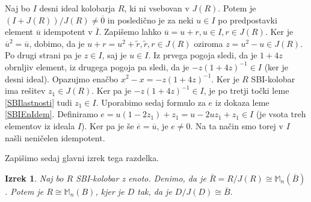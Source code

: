 \documentclass[a4paper, 12pt]{amsart}
\theoremstyle{definition} %
\theoremstyle{plain} %
\newtheorem{izrek}[definicija]{Izrek}
\newcommand{\M}{\mathbb M}
\begin{document}
\proof
Naj bo $I$ desni ideal kolobarja $R$, ki ni vsebovan v $J(R)$. Potem je $(I+J(R))/J(R) \neq \overline{0}$ in posledično je za neki $u\in I$ po predpostavki element $\overline{u}$ idempotent v $\overline{I}$. Zapišemo lahko $\overline{u} = u + r, u\in I, r \in J(R)$. Ker je $\overline{u}^2 = \overline{u}$, dobimo, da je $u+r = u^2 + \tilde{r}, \tilde{r},r\in J(R)$ oziroma $z= u^2 - u\in J(R)$. Po drugi strani pa je $z\in I$, saj je $u\in I$. Iz prvega pogoja sledi, da je $1+4z$ obrnljiv element, iz drugega pogoja pa sledi, da je $-z(1+4z)^{-1}\in I $ (ker je desni ideal). Opazujmo enačbo $x^2 - x = -z(1+4z)^{-1} $. Ker je $R$ SBI-kolobar ima rešitev $z_1 \in J(R)$. Ker pa je $-z(1+4z)^{-1}\in I$, je po tretji točki leme \ref{SBIlastnosti} tudi $z_1\in I$. Uporabimo sedaj formulo za $e$ iz dokaza leme \ref{SBIEnIdem}. Definiramo $e=u(1-2z_1) + z_1 = u - 2uz_1 + z_1\in I$ (je vsota treh elementov iz ideala  $I$). Ker pa je še $\overline{e} = \overline{u}$, je $e\neq 0$. Na ta način smo torej v $I$ našli neničelen idempotent.
\endproof

Zapišimo sedaj glavni izrek tega razdelka.

\begin{izrek}
\label{SBIizrek}
Naj bo $R$ SBI-kolobar z enoto. Denimo, da je $\overline{R}  = R/J(R) \cong \M_n(\overline{B})$. Potem je $R \cong \M_n(B)$, kjer je $D$ tak, da je  $D/J(D) \cong \overline{B}$.
\end{izrek}
\end{document}
